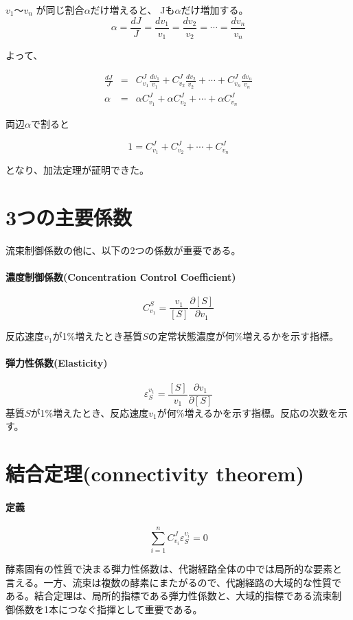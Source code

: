 \(v_1\)～\(v_n\) が同じ割合\(\alpha\)だけ増えると、 Jも\(\alpha\)だけ増加する。
\[
\alpha = \frac{dJ} {J} = \frac{dv_1}{v_1} = \frac{dv_2}{v_2} = \cdots = \frac{dv_n}{v_n}
\]

よって、

\begin{eqnarray*}
\frac{dJ} {J}  & = & C^J_{v_1}\frac{dv_1}{v_1} + C^J_{v_2}\frac{dv_2}{v_2} + \cdots + C^J_{v_n}\frac{dv_n}{v_n}\\
\alpha & = & \alpha  C^J_{v_1} + \alpha C^J_{v_2} + \cdots + \alpha C^J_{v_n}
\end{eqnarray*}

両辺\(\alpha\)で割ると

\[1  =  C^J_{v_1} + C^J_{v_2} + \cdots + C^J_{v_n}\]

となり、加法定理が証明できた。

\section{3つの主要係数}
流束制御係数の他に、以下の2つの係数が重要である。

\paragraph{濃度制御係数(Concentration Control Coefficient)}
\[C^S_{v_1} = \frac{v_1}{[S]}\frac{\partial [S]}{\partial v_1}\]

反応速度\(v_1\)が1\%増えたとき基質\(S\)の定常状態濃度が何\%増えるかを示す指標。

\paragraph{弾力性係数(Elasticity)}

\[\varepsilon^{v_1}_{S} = \frac{[S]}{v_1}\frac{\partial v_1}{\partial [S]}\]
基質\(S\)が1\%増えたとき、反応速度\(v_1\)が何\%増えるかを示す指標。反応の次数を示す。


\section{結合定理(connectivity theorem)}
\paragraph{定義}
\[\sum_{i=1}^n C^J_{v_i}\varepsilon^{v_i}_{S}=0\]

酵素固有の性質で決まる弾力性係数は、代謝経路全体の中では局所的な要素と
言える。一方、流束は複数の酵素にまたがるので、代謝経路の大域的な性質で
ある。結合定理は、局所的指標である弾力性係数と、大域的指標である流束制
御係数を1本につなぐ指揮として重要である。

